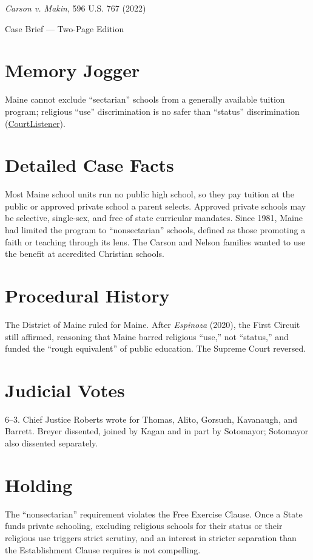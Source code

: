 \documentclass[12pt]{article}
\begin{document}
\begin{center}
{\LARGE \textit{Carson v. Makin}, 596 U.S. 767 (2022)\par}
\vspace{0.5em}
{\large Case Brief --- Two-Page Edition\par}
\end{center}

\section{Memory Jogger}
Maine cannot exclude ``sectarian'' schools from a generally available tuition program; religious ``use'' discrimination is no safer than ``status'' discrimination (\href{https://www.courtlistener.com/opinion/6479298/carson-v-makin/}{CourtListener}).

\section{Detailed Case Facts}
Most Maine school units run no public high school, so they pay tuition at the public or approved private school a parent selects. Approved private schools may be selective, single-sex, and free of state curricular mandates. Since 1981, Maine had limited the program to ``nonsectarian'' schools, defined as those promoting a faith or teaching through its lens. The Carson and Nelson families wanted to use the benefit at accredited Christian schools.

\section{Procedural History}
The District of Maine ruled for Maine. After \textit{Espinoza} (2020), the First Circuit still affirmed, reasoning that Maine barred religious ``use,'' not ``status,'' and funded the ``rough equivalent'' of public education. The Supreme Court reversed.

\section{Judicial Votes}
6--3. Chief Justice Roberts wrote for Thomas, Alito, Gorsuch, Kavanaugh, and Barrett. Breyer dissented, joined by Kagan and in part by Sotomayor; Sotomayor also dissented separately.

\section{Holding}
The ``nonsectarian'' requirement violates the Free Exercise Clause. Once a State funds private schooling, excluding religious schools for their status or their religious use triggers strict scrutiny, and an interest in stricter separation than the Establishment Clause requires is not compelling.
\end{document}
